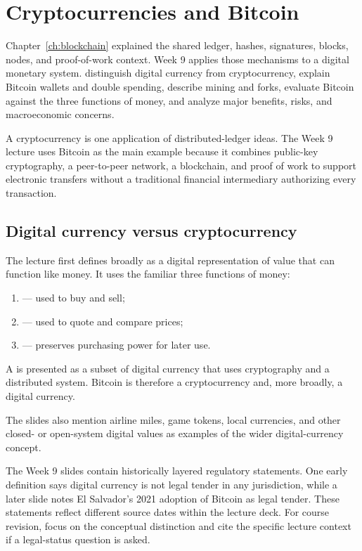 \chapter{Cryptocurrencies and Bitcoin}
\label{ch:cryptocurrencies}

\chapterguide%
  {Chapter~\ref{ch:blockchain} explained the shared ledger, hashes, signatures, blocks, nodes, and proof-of-work context. Week 9 applies those mechanisms to a digital monetary system.}
  {distinguish digital currency from cryptocurrency, explain Bitcoin wallets and double spending, describe mining and forks, evaluate Bitcoin against the three functions of money, and analyze major benefits, risks, and macroeconomic concerns.}

A cryptocurrency is one application of distributed-ledger ideas. The Week 9 lecture uses Bitcoin as the main example because it combines public-key cryptography, a peer-to-peer network, a blockchain, and proof of work to support electronic transfers without a traditional financial intermediary authorizing every transaction.

\section{Digital currency versus cryptocurrency}

The lecture first defines  broadly as a digital representation of value that can function like money. It uses the familiar three functions of money:

\begin{enumerate}
  \item {} --- used to buy and sell;
  \item {} --- used to quote and compare prices;
  \item {} --- preserves purchasing power for later use.
\end{enumerate}

A  is presented as a subset of digital currency that uses cryptography and a distributed system. Bitcoin is therefore a cryptocurrency and, more broadly, a digital currency.

The slides also mention airline miles, game tokens, local currencies, and other closed- or open-system digital values as examples of the wider digital-currency concept.

\begin{libnote}
The Week 9 slides contain historically layered regulatory statements. One early definition says digital currency is not legal tender in any jurisdiction, while a later slide notes El Salvador's 2021 adoption of Bitcoin as legal tender. These statements reflect different source dates within the lecture deck. For course revision, focus on the conceptual distinction and cite the specific lecture context if a legal-status question is asked.
\end{libnote}

